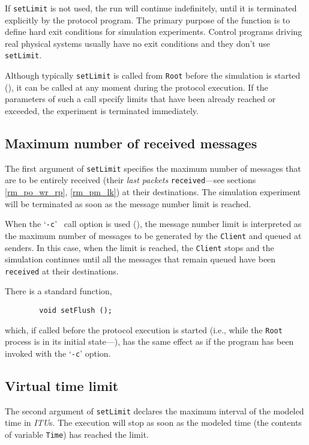 If {\tt setLimit} is not used, the run will continue
indefinitely, until it is terminated explicitly by the protocol
program.
The primary purpose of the function is to define hard exit conditions for
simulation experiments.
Control programs driving real physical systems usually have no exit conditions
and they don't use {\tt setLimit}.

Although typically {\tt setLimit} is called from {\tt Root} before the
simulation is started (),
it can be called at any moment during the protocol execution.
If the parameters of such a call specify limits that have been already
reached or exceeded, the experiment is terminated immediately.

\subsection{Maximum number of received messages}
\label{rm_ts_mm}

The first argument of {\tt setLimit} specifies the maximum number of
messages that are to be entirely received (their {\em last packets\/}
{\tt received}---see sections \ref{rm_po_wr_rp}, \ref{rm_pm_lk}) at their
destinations.
The simulation experiment will be terminated as soon as the message number
limit is reached.

When the `{\tt -c}' \smurph\ call option is used (),
the message number limit is interpreted as the maximum number of messages
to be generated by the {\tt Client} and queued at senders.
In this case, when the limit is reached, the {\tt Client} stops and the
simulation continues until all the messages that remain queued have been
{\tt received} at their destinations.

There is a standard function,
\begin{verbatim}
        void setFlush ();
\end{verbatim}
which, if called before the protocol
execution is started (i.e., while the {\tt Root} process is in its initial
state---), has the same effect as
if the program has been invoked with the `{\tt -c}' option.

\subsection{Virtual time limit}
\label{rm_ts_st}

The second argument of {\tt setLimit} declares the maximum interval of
the modeled time in {\em ITU\/}s.
The execution will stop as soon as the modeled time (the contents of
variable {\tt Time}) has reached the limit.

